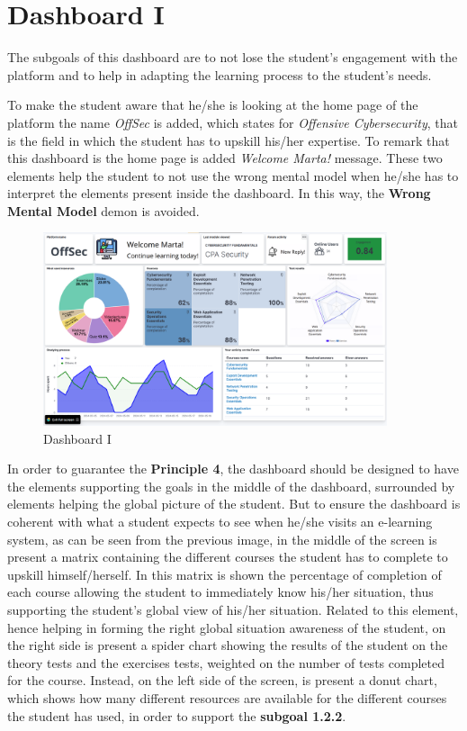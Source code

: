 \section{Dashboard I}

The subgoals of this dashboard are to not lose the student's engagement with 
the platform and to help in adapting the learning process to the student's
needs. 

To make the student aware that he/she is looking
at the home page of the platform the name \textit{OffSec} is added,
which states for \textit{Offensive Cybersecurity}, that is the field
in which the student has to upskill his/her expertise. To remark that this
dashboard is the home page is added \textit{Welcome Marta!} message.
These two elements help the student to not use the wrong mental model
when he/she has to interpret the elements present inside the dashboard.
In this way, the \textbf{Wrong Mental Model} demon is avoided.

\begin{figure}[H]
    \centering
    \includegraphics[width=0.9\textwidth]{assets/dashboard_1.png}
    \caption{Dashboard I}
    \label{fig:dashboard_1}
\end{figure}

In order to guarantee the \textbf{Principle 4}, the dashboard should be designed to have the
elements supporting the goals in the middle of the dashboard, surrounded by elements helping the
global picture of the student. But to ensure the dashboard
is coherent with what a student expects to see when he/she visits an e-learning system, as 
can be seen from the previous image, in the middle of the screen is present a matrix containing 
the different courses the student has to complete to upskill himself/herself. In this matrix is 
shown the percentage of completion of each course allowing the student to immediately know his/her
situation, thus supporting the student's global view of his/her situation. Related to this element, hence
helping in forming the right global situation awareness of the student, on 
the right side is present a spider chart showing the results of the student on the theory tests and
the exercises tests, weighted on the number of tests completed for the course.
Instead, on the left side of the screen, is present a
donut chart, which shows how many different resources are available for the different courses 
the student has used, in order to support the \textbf{subgoal 1.2.2}.

